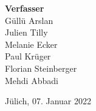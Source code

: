 \begin{titlepage}
  \vspace{1.5cm}

  \begin{center}
    {\Large \textbf{Verfasser}}\\[0.5cm]
    {\Large Güllü Arslan}\\[0.2cm]
    {\Large Julien Tilly}\\[0.2cm]
    {\Large Melanie Ecker}\\[0.2cm]
    {\Large Paul Krüger}\\[0.2cm]
    {\Large Florian Steinberger}\\[0.2cm]
    {\Large Mehdi Abbadi}\\

    \vspace{2cm}

    Jülich, 07. Januar 2022
  \end{center}

 

  \end{titlepage}

  
  \tableofcontents %

  \newpage
  \listoffigures
  \listoftables
  